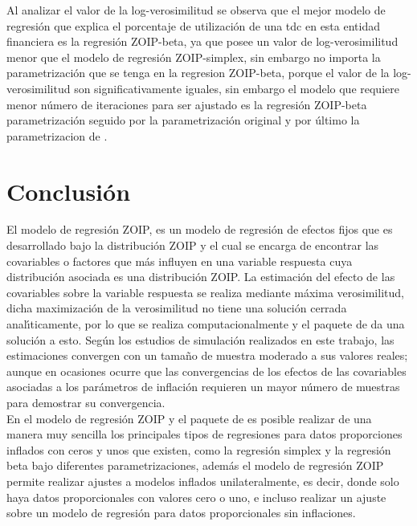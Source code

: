 Al analizar el valor de la log-verosimilitud se observa que el mejor modelo de regresi\'{o}n que explica el porcentaje de utilizaci\'{o}n de una tdc en esta entidad financiera es la regresi\'{o}n ZOIP-beta, ya que posee un valor de log-verosimilitud menor que el modelo de regresi\'{o}n ZOIP-simplex, sin embargo no importa la parametrizaci\'{o}n que se tenga en la regresion ZOIP-beta, porque el valor de la log-verosimilitud son significativamente iguales, sin embargo el modelo que requiere menor n\'{u}mero de iteraciones para ser ajustado es la regresi\'{o}n ZOIP-beta parametrizaci\'{o}n \cite{Ferrari2} seguido por la parametrizaci\'{o}n original y por \'{u}ltimo la parametrizacion de \cite{Stasinopoulos2}.


\section{Conclusi\'{o}n}

El modelo de regresi\'{o}n ZOIP, es un modelo de regresi\'{o}n de efectos fijos que es desarrollado bajo la distribuci\'{o}n ZOIP y el cual se encarga de encontrar las covariables o factores que m\'{a}s influyen en una variable respuesta cuya distribuci\'{o}n asociada es una distribuci\'{o}n ZOIP. La estimaci\'{o}n del efecto de las covariables sobre la variable respuesta se realiza mediante m\'{a}xima verosimilitud, dicha maximizaci\'{o}n de la verosimilitud no tiene una soluci\'{o}n cerrada anal\'{\i}ticamente, por lo que se realiza computacionalmente y el paquete  de  da una soluci\'{o}n a esto. Seg\'{u}n los estudios de simulaci\'{o}n realizados en este trabajo, las estimaciones convergen con un tama\~{n}o de muestra moderado a sus valores reales; aunque en ocasiones ocurre que las convergencias de los efectos de las covariables asociadas a los par\'{a}metros de inflaci\'{o}n requieren un mayor n\'{u}mero de muestras para demostrar su convergencia.\\

En el modelo de regresi\'{o}n ZOIP y el paquete  de  es posible realizar de una manera muy sencilla los principales tipos de regresiones para datos proporciones inflados con ceros y unos que existen, como la regresi\'{o}n simplex y la regresi\'{o}n beta bajo diferentes parametrizaciones, adem\'{a}s el modelo de regresi\'{o}n ZOIP permite realizar ajustes a modelos inflados unilateralmente, es decir, donde solo haya datos proporcionales con valores cero o uno, e incluso realizar un ajuste sobre un modelo de regresi\'{o}n para datos proporcionales sin inflaciones.

